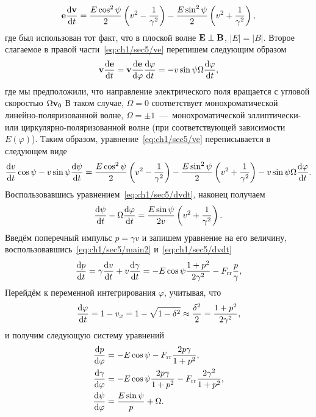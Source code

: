 \begin{equation}
    \vb{e}\dv{\vb{v}}{t} = \frac{E\cos^2\psi}{2} \left( v^2 - \frac{1}{\gamma^2} \right) - \frac{E\sin^2\psi }{2} \left( v^2 + \frac{1}{\gamma^2} \right),
\end{equation}
где был использован тот факт, что в плоской волне $\vb{E}\perp\vb{B}$, $|E|=|B|$.
Второе слагаемое в правой части~\eqref{eq:ch1/sec5/ve} перепишем следующим образом
\begin{equation}
    \vb{v}\dv{\vb{e}}{t} = \vb{v}\dv{\vb{e}}{\varphi}\dv{\varphi}{t} = -v \sin\psi \Omega \dv{\varphi}{t},
\end{equation}
где мы предположили, что направление электрического поля вращается с угловой скоростью $\Omega\vb{v}_0$
В таком случае, $\Omega = 0$ соответствует монохроматической линейно-поляризованной волне, $\Omega = \pm 1$~---~монохроматической эллиптически- или циркулярно-поляризованной волне (при соответствующей зависимости $E(\varphi)$).
Таким образом, уравнение~\eqref{eq:ch1/sec5/ve} переписывается в следующем виде
\begin{equation}
    \dv{v}{t}\cos\psi - v\sin\psi\dv{\psi}{t} = \frac{E\cos^2\psi}{2} \left( v^2 - \frac{1}{\gamma^2} \right) - \frac{E\sin^2\psi }{2} \left( v^2 + \frac{1}{\gamma^2} \right) - v \sin\psi \Omega \dv{\varphi}{t}.
\end{equation}
Воспользовавшись уравнением~\eqref{eq:ch1/sec5/dvdt}, наконец получаем
\begin{equation}
    \dv{\psi}{t} - \Omega \dv{\varphi}{t} = \frac{E \sin\psi}{2v} \left( v^2 + \frac{1}{\gamma^2} \right).
\end{equation}
Введём поперечный импульс $p=\gamma v$ и запишем уравнение на его величину, воспользовавшись~\eqref{eq:ch1/sec5/main2} и~\eqref{eq:ch1/sec5/dvdt}
\begin{equation}
    \dv{p}{t} = \gamma\dv{v}{t} + v\dv{\gamma}{t} = -E\cos\psi\frac{1 + p^2}{2\gamma^2} - F_\mathrm{rr}\frac{p}{\gamma},
\end{equation}
Перейдём к переменной интегрирования $\varphi$, учитывая, что
\begin{equation}
    \dv{\varphi}{t} = 1 - v_x = 1 - \sqrt{1 - \delta^2} \approx \frac{\delta^2}{2} = \frac{1 + p^2}{2\gamma^2},
\end{equation}
и получим следующую систему уравнений 
\begin{align}
    \dv{p}{\varphi} &= -E\cos\psi - F_\mathrm{rr} \frac{2p \gamma}{1+p^2} ,\\
    \dv{\gamma}{\varphi} &= -E\cos\psi\frac{2p\gamma }{1+p^2}-F_\mathrm{rr}\frac{2\gamma^2}{1+p^2} ,\\
    \dv{\psi}{\varphi} &=  \frac{E\sin\psi}{p} + \Omega .
\end{align}
